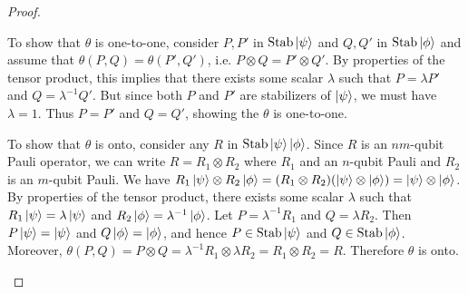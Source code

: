\documentclass[12pt]{dalthesis}
\begin{document}
\begin{proof}
\begin{enumerate}
To show that $\theta$ is one-to-one, consider $P, P'$ in $\mathrm{Stab} \ket{\psi}$ and $Q, Q'$ in $\mathrm{Stab} \ket{\phi}$ and assume that $\theta (P, Q) = \theta (P', Q')$, i.e. $P \otimes Q = P' \otimes Q'$. By properties of the tensor product, this implies that there exists some scalar $\lambda$ such that $P = \lambda P'$ and $Q = \lambda^{-1} Q'$. But since both $P$ and $P'$ are stabilizers of $\ket{\psi}$, we must have $\lambda = 1$. Thus $P=P'$ and $Q = Q'$, showing the $\theta$ is one-to-one.

To show that $\theta$ is onto, consider any $R$ in $\mathrm{Stab} \ket{\psi} \ket{\phi}$. Since $R$ is an $nm$-qubit Pauli operator, we can write $R = R_1 \otimes R_2$ where $R_1$ and an $n$-qubit Pauli and $R_2$ is an $m$-qubit Pauli. We have $R_1 \ket{\psi} \otimes R_2 \ket{\phi} = (R_1 \otimes R_2) (\ket{\psi} \otimes \ket{\phi}) = \ket{\psi} \otimes \ket{\phi}$. By properties of the tensor product, there exists some scalar $\lambda$ such that $R_1 \ket{\psi} = \lambda \ket{\psi}$ and $R_2 \ket{\phi} = \lambda^{-1} \ket{\phi}$. Let $P = \lambda^{-1} R_1 $ and $Q = \lambda R_2$. Then $P\ket{\psi} = \ket{\psi}$ and $Q \ket{\phi} = \ket{\phi}$, and hence $P \in \mathrm{Stab} \ket{\psi}$ and $Q \in \mathrm{Stab} \ket{\phi}$. Moreover, $\theta (P, Q) = P \otimes Q = \lambda^{-1} R_1 \otimes \lambda R_2 = R_1 \otimes R_2 = R$. Therefore $\theta$ is onto.





\end{enumerate}
\end{proof}
\end{document}
